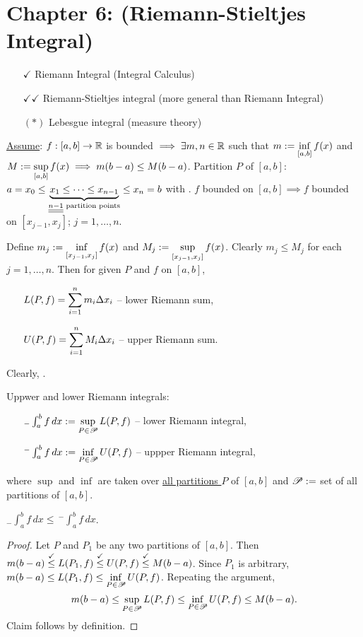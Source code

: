 \documentclass[]{article}
\begin{document}
\section*{Chapter 6: (Riemann-Stieltjes Integral)}

\begin{enumerate}
	\item[$\checkmark$] Riemann Integral (Integral Calculus)
	\item[$\checkmark\checkmark$] Riemann-Stieltjes integral (more general than Riemann Integral)
	\item[$(*)$] Lebesgue integral (measure theory)
\end{enumerate}
\ul{Assume}: $f:[a,b]\ra\mb R$ is bounded $\implies \exists m,n\in\mb R$ such that $\ds m:=\inf_{[a,b]} f(x)$ and $\ds M:=\sup_{[a,b]}f(x) \implies m(b-a) \leq M(b-a)$.
Partition $P$ of $[a,b]$: $a=x_0\leq \ub{\ul{\ul{n-1}}\text{ partition points}}{x_1\leq\dots\leq x_{n-1}}\leq x_n=b$ with .
$f$ bounded on $[a,b]\implies f$ bounded on $[x_{j-1},x_j]$; $j=1,\dots,n$.

Define $\ds m_j := \inf_{[x_{j-1},x_j]}f(x)$ and $\ds M_j:=\sup_{[x_{j-1},x_j]}f(x)$.
Clearly $m_j\leq M_j$ for each $j=1,\dots,n$.
\newpage
Then for given $P$ and $f$ on $[a,b]$,
\begin{enumerate}
	\item[] $\ds L(P,f) = \sum_{i=1}^n m_i\Delta x_i$ -- lower Riemann sum,
	\item[] $\ds U(P,f) = \sum_{i=1}^n M_i\Delta x_i$ -- upper Riemann sum.
\end{enumerate}
Clearly, .

Uppwer and lower Riemann integrals:
\begin{enumerate}
	\item[] $_-\int_a^b f\,dx := \ds\sup_{P\in\ms P} L(P,f)$ -- lower Riemann integral,
	\item[] $^-\int_a^b f\,dx := \ds\inf_{P\in\ms P} U(P,f)$ -- uppper Riemann integral,
\end{enumerate}
where $\sup$ and $\inf$ are taken over \ul{all partitions $P$} of $[a,b]$ and $\ms P := $ set of all partitions of $[a,b]$.

\begin{lemma}
	$ _-\int_a^bf\,dx\leq\, ^-\int_a^bf\,dx$.
\end{lemma}
\begin{proof}
	Let $P$ and $P_1$ be any two partitions of $[a,b]$. Then $m(b-a)\os\checkmark\leq L(P_1,f) \os\checkmark\leq U(P,f) \os\checkmark\leq M(b-a)$.
	Since $P_1$ is arbitrary, $\ds m(b-a)\leq L(P_1,f) \leq \inf_{P\in\ms P} U(P,f)$.
	Repeating the argument, $$\ds m(b-a)\leq \sup_{P\in\ms P} L(P,f) \leq \inf_{P\in\ms P} U(P,f) \leq M(b-a).$$
	Claim follows by definition.
\end{proof}
\end{document}
